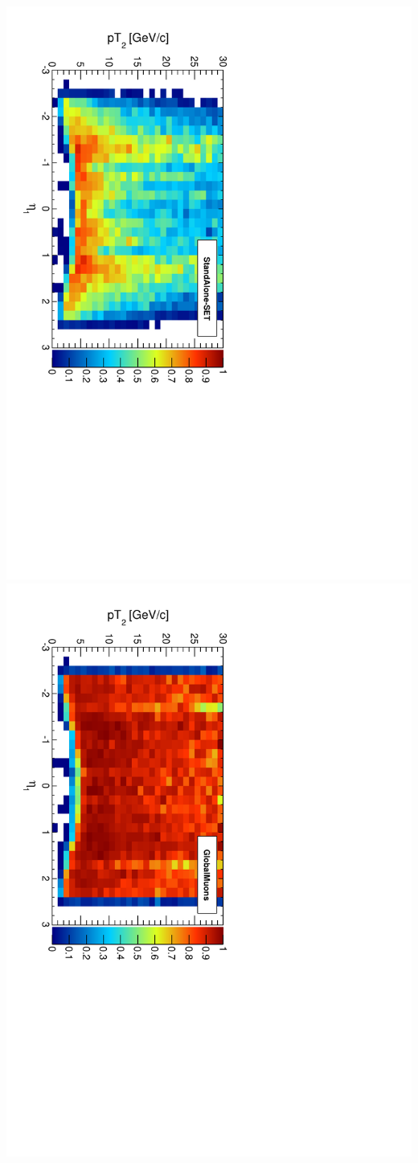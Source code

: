 \documentclass[compress]{beamer}
\begin{document}
\begin{frame}
\includegraphics[height=0.45\linewidth, angle=90]{pt2vseta1_StandAloneUpdatedSET.pdf}
\includegraphics[height=0.45\linewidth, angle=90]{pt2vseta1_GlobalMuons.pdf}
\end{frame}
\end{document}
